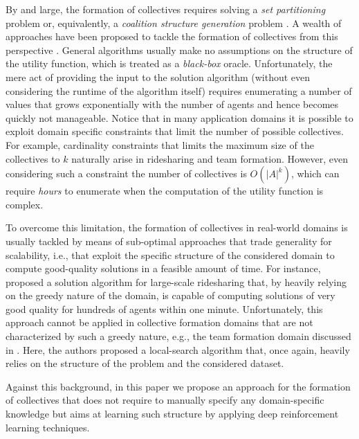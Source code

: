 \documentclass{article}
\theoremstyle{definition}
\begin{document}
By and large, the formation of collectives requires solving a \emph{set partitioning} problem \cite{lin1975corporate} or, equivalently, a \emph{coalition structure generation} problem \cite{michalak2016hybrid}.
A wealth of approaches have been proposed to tackle the formation of collectives from this perspective \cite{rahwan2015coalition}.
General algorithms \cite{changder2020odss,michalak2016hybrid} usually make no assumptions on the structure of the utility function, which is treated as a \emph{black-box} oracle.
Unfortunately, the mere act of providing the input to the solution algorithm (without even considering the runtime of the algorithm itself) requires enumerating a number of values that grows exponentially with the number of agents and hence becomes quickly not manageable. %
Notice that in many application domains it is possible to exploit domain specific constraints that limit the number of possible collectives. For example, cardinality constraints that limits the maximum size of the collectives to $k$ naturally arise in ridesharing and team formation. However, even considering such a constraint the number of collectives is $O(|A|^k)$, which can require \emph{hours} to enumerate when the computation of the utility function is complex.

To overcome this limitation, the formation of collectives in real-world domains is usually tackled by means of sub-optimal approaches that trade generality for scalability, i.e., that exploit the specific structure of the considered domain to compute good-quality solutions in a feasible amount of time.
For instance, \cite{bistaffa2019computational} proposed a solution algorithm for large-scale ridesharing that, by heavily relying on the greedy nature of the domain, is capable of computing solutions of very good quality for hundreds of agents within one minute.
Unfortunately, this approach cannot be applied in collective formation domains that are not characterized by such a greedy nature, e.g., the team formation domain discussed in \cite{andrejczuk2019synergistic}.
Here, the authors proposed a local-search algorithm that, once again, heavily relies on the structure of the problem and the considered dataset.

Against this background, in this paper we propose an approach for the formation of collectives that does not require to manually specify any domain-specific knowledge but aims at learning such structure by applying deep reinforcement learning techniques.
\end{document}

